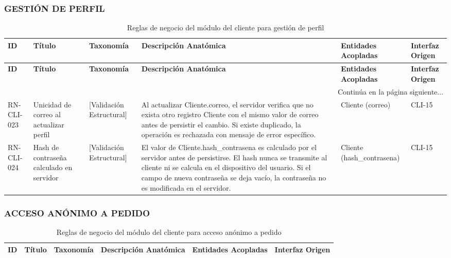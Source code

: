 \begin{landscape}
\subsubsection{GESTIÓN DE PERFIL}
\begingroup
\setlength{\LTleft}{\fill}
\setlength{\LTright}{\fill}

\begin{longtable}[c]{l p{2.1cm} p{2.1cm} p{8cm} p{4cm} p{3cm}}
\caption{Reglas de negocio del módulo del cliente para gestión de perfil} \label{tab:reglas-negocio-cliente-gestion-perfil}\\
\toprule
\textbf{ID} & \textbf{Título} & \textbf{Taxonomía} & \textbf{Descripción Anatómica} & \textbf{Entidades Acopladas} & \textbf{Interfaz Origen} \\
\midrule
\endfirsthead

\toprule
\textbf{ID} & \textbf{Título} & \textbf{Taxonomía} & \textbf{Descripción Anatómica} & \textbf{Entidades Acopladas} & \textbf{Interfaz Origen} \\
\midrule
\endhead

\midrule
\multicolumn{6}{r}{\small Continúa en la página siguiente...} \\
\endfoot
\bottomrule
\endlastfoot

RN-CLI-023 & Unicidad de correo al actualizar perfil & [Validación Estructural] & Al actualizar Cliente.correo, el servidor verifica que no exista otro registro Cliente con el mismo valor de correo antes de persistir el cambio. Si existe duplicado, la operación es rechazada con mensaje de error específico. & Cliente (correo) & CLI-15 \\
\addlinespace
RN-CLI-024 & Hash de contraseña calculado en servidor & [Validación Estructural] & El valor de Cliente.hash\_contrasena es calculado por el servidor antes de persistirse. El hash nunca se transmite al cliente ni se calcula en el dispositivo del usuario. Si el campo de nueva contraseña se deja vacío, la contraseña no es modificada en el servidor. & Cliente (hash\_contrasena) & CLI-15 \\
\end{longtable}
\endgroup

\subsubsection{ACCESO ANÓNIMO A PEDIDO}
\begingroup
\setlength{\LTleft}{\fill}
\setlength{\LTright}{\fill}

\begin{longtable}[c]{l p{2.1cm} p{2.1cm} p{8cm} p{4cm} p{3cm}}
\caption{Reglas de negocio del módulo del cliente para acceso anónimo a pedido} \label{tab:reglas-negocio-cliente-acceso-anonomo-pedido}\\
\toprule
\textbf{ID} & \textbf{Título} & \textbf{Taxonomía} & \textbf{Descripción Anatómica} & \textbf{Entidades Acopladas} & \textbf{Interfaz Origen} \\
\midrule
\endfirsthead


\end{longtable}
\end{landscape}
